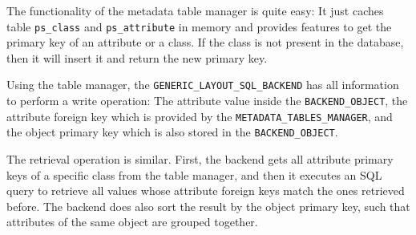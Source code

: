 \documentclass[a4paper,12pt]{report}
\begin{document}
The functionality of the metadata table manager is quite easy:
It just caches table \lstinline!ps_class! and \lstinline!ps_attribute! in memory and provides features to get the primary key of an attribute or a class.
If the class is not present in the database, then it will insert it and return the new primary key.

Using the table manager, the \lstinline!GENERIC_LAYOUT_SQL_BACKEND! has all information to perform a write operation:
The attribute value inside the \lstinline!BACKEND_OBJECT!, the attribute foreign key which is provided by the \lstinline!METADATA_TABLES_MANAGER!, 
and the object primary key which is also stored in the \lstinline!BACKEND_OBJECT!.

The retrieval operation is similar.
First, the backend gets all attribute primary keys of a specific class from the table manager, and then it executes an SQL query to retrieve all values whose attribute foreign keys match the ones retrieved before.
The backend does also sort the result by the object primary key, such that attributes of the same object are grouped together.
\end{document}
